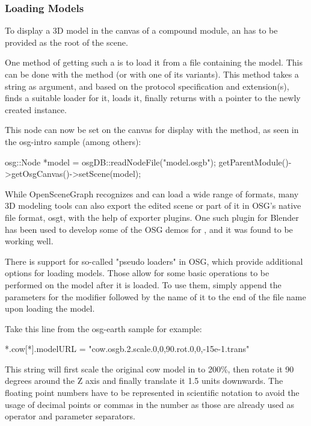 \subsubsection{Loading Models}
\label{sec:graphics:osg-loading-models}

To display a 3D model in the canvas of a compound module, an  has
to be provided as the root of the scene.

One method of getting such a  is to load it from a file containing the
model. This can be done with the  method (or with one
of its variants). This method takes a string as argument, and based on the
protocol specification and extension(s), finds a suitable loader for it,
loads it, finally returns with a pointer to the newly created 
instance.

This node can now be set on the canvas for display with the 
method, as seen in the osg-intro sample (among others):

\begin{cpp}
osg::Node *model = osgDB::readNodeFile("model.osgb");
getParentModule()->getOsgCanvas()->setScene(model);
\end{cpp}

\begin{note}
 While OpenSceneGraph recognizes and can
load a wide range of formats, many 3D modeling tools can also export the
edited scene or part of it in OSG's native file format, osgt, with the
help of exporter plugins. One such plugin for Blender has been used to
develop some of the OSG demos for {\opp}, and it was found to be working
well.
\end{note}

There is support for so-called "pseudo loaders" in OSG, which provide
additional options for loading models. Those allow for some basic
operations to be performed on the model after it is loaded. To use them,
simply append the parameters for the modifier followed by the name of it to
the end of the file name upon loading the model.

Take this line from the osg-earth sample for example:

\begin{inifile}
*.cow[*].modelURL = "cow.osgb.2.scale.0,0,90.rot.0,0,-15e-1.trans"
\end{inifile}

This string will first scale the original cow model in  to
200\%, then rotate it 90 degrees around the Z axis and finally translate it
1.5 units downwards. The floating point numbers have to be represented in
scientific notation to avoid the usage of decimal points or commas in the
number as those are already used as operator and parameter separators.

